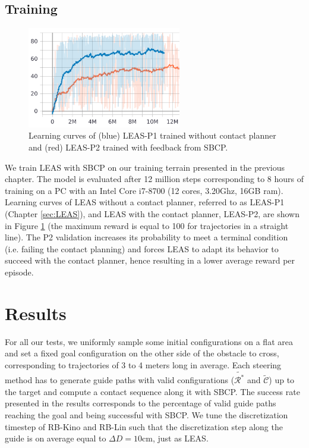 \subsection{Training}
\begin{figure}[t]
    \centering
    \includegraphics[width=0.6\textwidth]{Figures/Chapter_CPSB/learning_curve_p1_p2.png}
    \caption{Learning curves of (blue) LEAS-P1 trained without contact planner and (red) LEAS-P2 trained with feedback from SBCP.}
    \label{fig:cp-sb:learning_curves_p1_p2}
\end{figure}
We train LEAS with SBCP on our training terrain presented in the previous chapter.
The model is evaluated after 12 million steps corresponding to 8 hours of training on a PC with an Intel Core i7-8700 (12 cores, 3.20Ghz, 16GB ram). 
Learning curves of LEAS without a contact planner, referred to as LEAS-P1 (Chapter \ref{sec:LEAS}), and LEAS with the contact planner, LEAS-P2, are shown in Figure \ref{fig:cp-sb:learning_curves_p1_p2} (the maximum reward is equal to 100 for trajectories in a straight line). 
The P2 validation increases its probability to meet a terminal condition (i.e. failing the contact planning) and forces LEAS to adapt its behavior to succeed with the contact planner, hence resulting in a lower average reward per episode.

\section{Results\label{sub:cp-sb:results}}

For all our tests, we uniformly sample some initial configurations on a flat area and set a fixed goal configuration on the other side of the obstacle to cross, corresponding to trajectories of 3 to 4 meters long in average.
Each steering method has to generate guide paths with valid configurations ($\tilde{\mathcal{R}^*}$ and $\tilde{\mathcal{C}}$) up to the target and compute a contact sequence along it with SBCP.
The success rate presented in the results corresponds to the percentage of valid guide paths reaching the goal and being successful with SBCP.
We tune the discretization timestep of RB-Kino and RB-Lin such that the discretization step along the guide is on average equal to $\Delta D=10$cm, just as LEAS.

